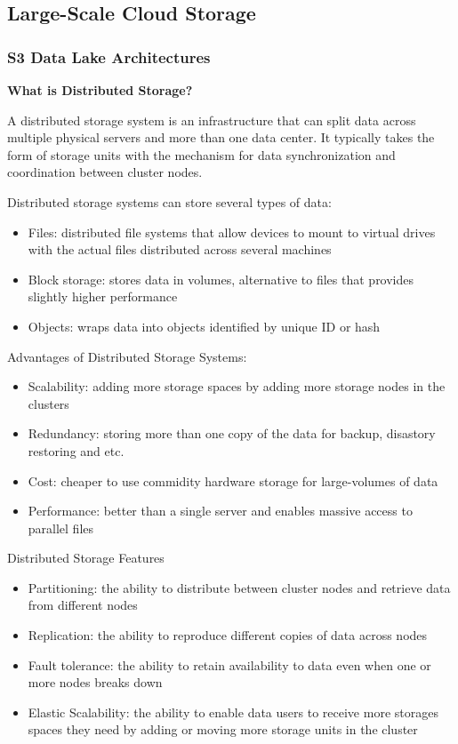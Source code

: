 \documentclass{article}
\begin{document}
\subsection{Large-Scale Cloud Storage}

\subsubsection{S3 Data Lake Architectures}

\textbf{What is Distributed Storage?}

A distributed storage system is an infrastructure that can split data across multiple physical servers and more than one data center. It typically takes the form of storage units with the mechanism for data synchronization and coordination between cluster nodes.

Distributed storage systems can store several types of data:

\begin{itemize}
    \item Files: distributed file systems that allow devices to mount to virtual drives with the actual files distributed across several machines
    \item Block storage: stores data in volumes, alternative to files that provides slightly higher performance
    \item Objects: wraps data into objects identified by unique ID or hash
\end{itemize}

Advantages of Distributed Storage Systems:

\begin{itemize}
    \item Scalability: adding more storage spaces by adding more storage nodes in the clusters
    \item Redundancy: storing more than one copy of the data for backup, disastory restoring and etc.
    \item Cost: cheaper to use commidity hardware storage for large-volumes of data
    \item Performance: better than a single server and enables massive access to parallel files
\end{itemize}

Distributed Storage Features

\begin{itemize}
    \item Partitioning: the ability to distribute between cluster nodes and retrieve data from different nodes 
    \item Replication: the ability to reproduce different copies of data across nodes 
    \item Fault tolerance: the ability to retain availability to data even when one or more nodes breaks down
    \item Elastic Scalability: the ability to enable data users to receive more storages spaces they need by adding or moving more storage units in the cluster
\end{itemize}
\end{document}
